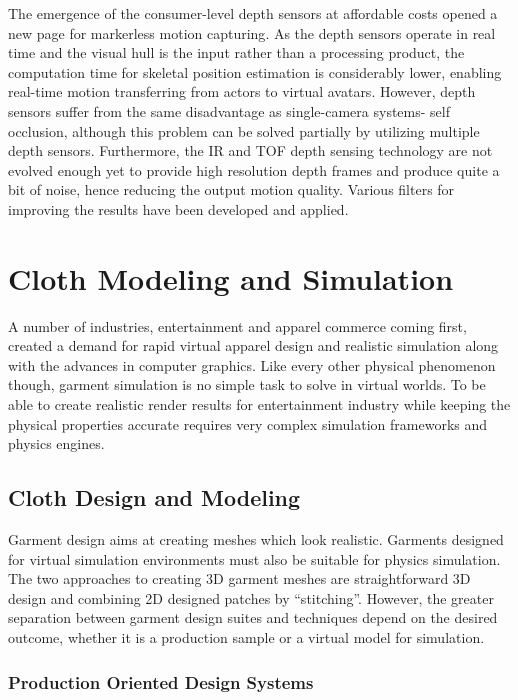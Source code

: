  The emergence of the consumer-level depth sensors at affordable costs opened a new page for markerless motion capturing\cite{Dutta2012}. As the depth sensors operate in real time
 and the visual hull is the input rather than a processing product, the computation time for skeletal position estimation is considerably lower, enabling 
 real-time motion transferring from actors to virtual avatars. However, depth sensors suffer from the same disadvantage as single-camera systems- self occlusion,
 although this problem can be solved partially by utilizing multiple depth sensors\cite{Berger2011}.
 Furthermore, the IR and TOF depth sensing technology are not evolved enough yet to provide high resolution depth frames and produce quite a bit of noise, hence 
 reducing the output motion quality. Various filters for improving the results have been developed and applied\cite{Matyunin2011,Camplani2012}. 
 
 \section{Cloth Modeling and Simulation}
 
 A number of industries, entertainment and apparel commerce coming first, created a demand for rapid virtual apparel design and realistic simulation along 
 with the advances in computer graphics. Like every other physical phenomenon though, garment simulation is no simple task to solve in virtual worlds. To be able
 to create realistic render results for entertainment industry while keeping the physical properties accurate requires very complex simulation frameworks and 
 physics engines. 
 
 \subsection{Cloth Design and Modeling}
 
 Garment design aims at creating meshes which look realistic. Garments designed for virtual simulation environments must also be suitable for physics simulation. 
 The two approaches to creating 3D garment meshes are straightforward 3D design and combining 2D designed patches by ``stitching''. However, the greater separation
 between garment design suites and techniques depend on the desired outcome, whether it is a production sample or a virtual model for simulation.
 
\subsubsection{Production Oriented Design Systems}

